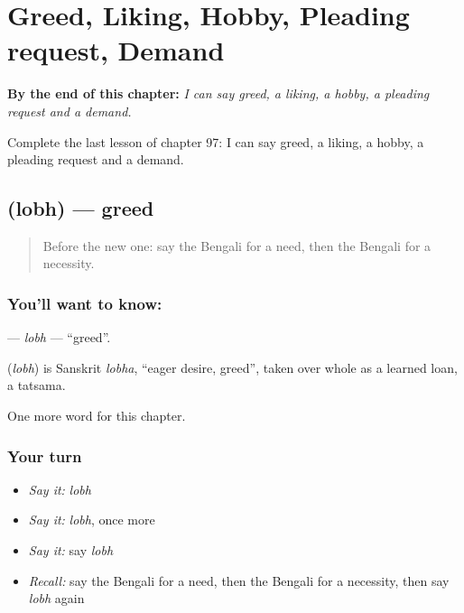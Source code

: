 
\chapter{Greed, Liking, Hobby, Pleading request, Demand}
\label{ch:bn-greed-liking-hobby-pleading-request-demand}

\begin{chapteropening}
\textbf{By the end of this chapter:} \emph{I can say greed, a liking, a hobby, a pleading request and a demand.}

Complete the last lesson of chapter 97: I can say greed, a liking, a hobby, a pleading request and a demand.
\end{chapteropening}

\section[\texorpdfstring{\bn{লোভ} (lobh)}{লোভ (lobh)}]{ (lobh) — greed}

\label{lesson:BN-C97-lobh}



\begin{quote}
Before the new one: say the Bengali for a need, then the Bengali for a necessity.
\end{quote}

\subsection*{You'll want to know: }
\textbf{} — \emph{lobh} — \textquotedblleft{}greed\textquotedblright{}.

\begin{cousinweb}
\textbf{} (\emph{lobh}) is Sanskrit \emph{lobha}, \textquotedblleft{}eager desire, greed\textquotedblright{}, taken over whole as a learned loan, a tatsama.
\end{cousinweb}

\begin{grammarlens}[title={What you've built}]
One more word for this chapter.
\end{grammarlens}

\subsection*{Your turn}
\begin{itemize}
\raggedright
  \item \emph{Say it:} \emph{lobh}
  \item \emph{Say it:} \emph{lobh}, once more
  \item \emph{Say it:} say \emph{lobh}
  \item \emph{Recall:} say the Bengali for a need, then the Bengali for a necessity, then say \emph{lobh} again
\end{itemize}

